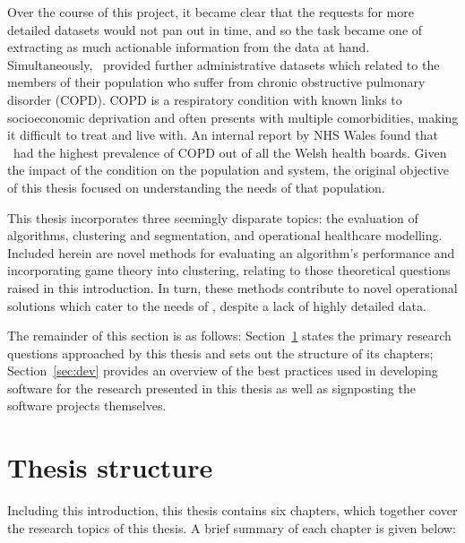 Over the course of this project, it became clear that the requests for more
detailed datasets would not pan out in time, and so the task became one of
extracting as much actionable information from the data at hand. Simultaneously,
\ctmuhb\ provided further administrative datasets which related to the members
of their population who suffer from chronic obstructive pulmonary disorder
(COPD). COPD is a respiratory condition with known links to socioeconomic
deprivation and often presents with multiple comorbidities, making it difficult
to treat and live with. An internal report by NHS Wales found that \ctmuhb\ had
the highest prevalence of COPD out of all the Welsh health boards. Given the
impact of the condition on the population and system, the original objective of
this thesis focused on understanding the needs of that population.

This thesis incorporates three seemingly disparate topics: the evaluation of
algorithms, clustering and segmentation, and operational healthcare modelling.
Included herein are novel methods for evaluating an algorithm's performance and
incorporating game theory into clustering, relating to those theoretical
questions raised in this introduction. In turn, these methods contribute to
novel operational solutions which cater to the needs of \ctmuhb, despite a lack
of highly detailed data.

The remainder of this section is as follows: Section~\ref{sec:thesis} states
the primary research questions approached by this thesis and sets out the
structure of its chapters; Section~\ref{sec:dev} provides an overview of the
best practices used in developing software for the research presented in this
thesis as well as signposting the software projects themselves.


\section{Thesis structure}\label{sec:thesis}

Including this introduction, this thesis contains six chapters, which together
cover the research topics of this thesis. A brief summary of each chapter is
given below:

